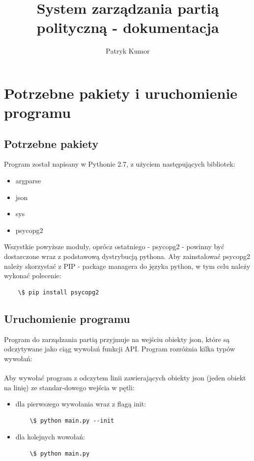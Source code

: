 \documentclass{article}
\title{System zarządzania partią polityczną - dokumentacja}
\author{Patryk Kumor}
\begin{document}
  \maketitle
  \newpage
  \tableofcontents
  \newpage


\section{Potrzebne pakiety i uruchomienie programu}

\subsection{ Potrzebne pakiety } 

Program został napisany w Pythonie 2.7, z użyciem następujących bibliotek: 
\begin{itemize}
    \item argparse 
    \item json 
    \item sys 
    \item psycopg2 
\end{itemize}
Wszystkie powyższe moduły, oprócz ostatniego - psycopg2 - powinny być dostarczone wraz z podstawową dystrybucją pythona. \newline
Aby zainstalować psycopg2 należy skorzystać z PIP - package managera do\,\,języka python, w tym celu należy wykonać polecenie:
\begin{verbatim}
    \$ pip install psycopg2
\end{verbatim}

\subsection{ Uruchomienie programu }  
Program do zarządzania partią przyjmuje na wejściu obiekty json, które są odczytywane jako ciąg wywołań funkcji API. \newline
Program rozróżnia kilka typów wywołań: 

\paragraph{}  
Aby wywołać program z odczytem linii zawierających obiekty json (jeden obiekt na linię) ze\,\,standar-dowego wejścia w pętli:
\begin{itemize}
\item dla pierwszego wywołania wraz z flagą init:
\begin{verbatim}
    \$ python main.py --init
\end{verbatim}
\item dla kolejnych wowołań:
\begin{verbatim}
    \$ python main.py 
\end{verbatim}
\end{itemize}
\end{document}

